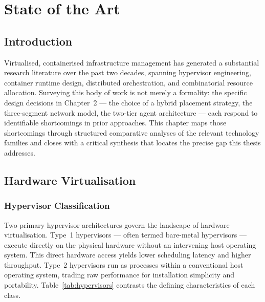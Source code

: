 \documentclass[12pt,a4paper]{report}
\begin{document}
\chapter{State of the Art}

\section{Introduction}

Virtualised, containerised infrastructure management has generated a substantial
research literature over the past two decades, spanning hypervisor engineering,
container runtime design, distributed orchestration, and combinatorial resource
allocation. Surveying this body of work is not merely a formality: the specific
design decisions in Chapter~2 --- the choice of a hybrid placement strategy, the
three-segment network model, the two-tier agent architecture --- each respond to
identifiable shortcomings in prior approaches. This chapter maps those shortcomings
through structured comparative analyses of the relevant technology families and closes
with a critical synthesis that locates the precise gap this thesis addresses.

\section{Hardware Virtualisation}

\subsection{Hypervisor Classification}

Two primary hypervisor architectures govern the landscape of hardware virtualisation.
Type~1 hypervisors --- often termed bare-metal hypervisors --- execute directly on
the physical hardware without an intervening host operating system. This direct
hardware access yields lower scheduling latency and higher throughput. Type~2
hypervisors run as processes within a conventional host operating system, trading
raw performance for installation simplicity and portability. Table~\ref{tab:hypervisors}
contrasts the defining characteristics of each class.
\end{document}
